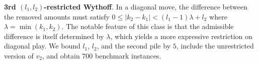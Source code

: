 \documentclass[review]{elsarticle}
\newcommand{\set}[1]{\{ #1 \}}
\newcommand{\tuple}[1]{\langle {#1} \rangle}
\newcommand{\true}{\top}
\newcommand{\statevar}{\mathcal{X}}
\newcommand{\act}{\mathcal{A}}
\newcommand{\constraint}{\mathcal{C}}
\newcommand{\estate}{\mathcal{E}}
\newcommand{\pre}{\mathtt{pre}}
\newcommand{\eff}{\mathtt{eff}}
\begin{document}
{\color{red}\textbf{3rd $(l_1,l_2)$-restricted Wythoff}. In a diagonal move, the difference between the removed amounts must satisfy $0 \le |k_2-k_1| < (l_1-1)\lambda + l_2$ where $\lambda = \min(k_1,k_2)$.}
{\color{red}The notable feature of this class is that the admissible difference is itself determined by $\lambda$, which yields a more expressive restriction on diagonal play.}
{\color{red}We bound $l_1$, $l_2$, and the second pile by $5$, include the unrestricted version of $v_2$, and obtain $700$ benchmark instances.}
\end{document}

